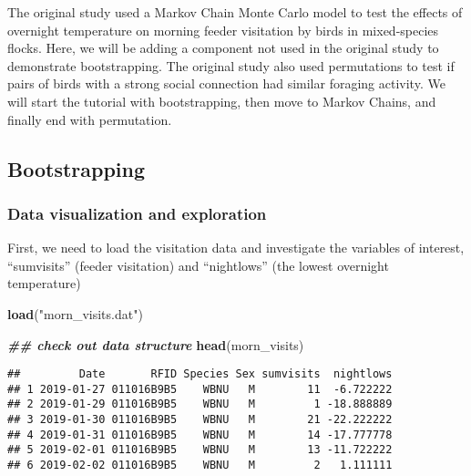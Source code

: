 \documentclass[
]{article}
\newenvironment{Shaded}{\begin{snugshade}}{\end{snugshade}}
\newcommand{\DocumentationTok}[1]{\textcolor[rgb]{0.56,0.35,0.01}{\textbf{\textit{#1}}}}
\newcommand{\FunctionTok}[1]{\textcolor[rgb]{0.13,0.29,0.53}{\textbf{#1}}}
\newcommand{\NormalTok}[1]{#1}
\newcommand{\SpecialCharTok}[1]{\textcolor[rgb]{0.81,0.36,0.00}{\textbf{#1}}}
\newcommand{\StringTok}[1]{\textcolor[rgb]{0.31,0.60,0.02}{#1}}
\begin{document}
The original study used a Markov Chain Monte Carlo model to test the
effects of overnight temperature on morning feeder visitation by birds
in mixed-species flocks. Here, we will be adding a component not used in
the original study to demonstrate bootstrapping. The original study also
used permutations to test if pairs of birds with a strong social
connection had similar foraging activity. We will start the tutorial
with bootstrapping, then move to Markov Chains, and finally end with
permutation.

\hypertarget{bootstrapping}{%
\subsection{Bootstrapping}\label{bootstrapping}}

\hypertarget{data-visualization-and-exploration}{%
\subsubsection{Data visualization and
exploration}\label{data-visualization-and-exploration}}

First, we need to load the visitation data and investigate the variables
of interest, ``sumvisits'' (feeder visitation) and ``nightlows'' (the
lowest overnight temperature)

\begin{Shaded}
\begin{Highlighting}[]
\FunctionTok{load}\NormalTok{(}\StringTok{"morn\_visits.dat"}\NormalTok{)}

\DocumentationTok{\#\# check out data structure}
\FunctionTok{head}\NormalTok{(morn\_visits)}
\end{Highlighting}
\end{Shaded}

\begin{verbatim}
##         Date       RFID Species Sex sumvisits  nightlows
## 1 2019-01-27 011016B9B5    WBNU   M        11  -6.722222
## 2 2019-01-29 011016B9B5    WBNU   M         1 -18.888889
## 3 2019-01-30 011016B9B5    WBNU   M        21 -22.222222
## 4 2019-01-31 011016B9B5    WBNU   M        14 -17.777778
## 5 2019-02-01 011016B9B5    WBNU   M        13 -11.722222
## 6 2019-02-02 011016B9B5    WBNU   M         2   1.111111
\end{verbatim}

\begin{Shaded}
\end{Shaded}
\end{document}
